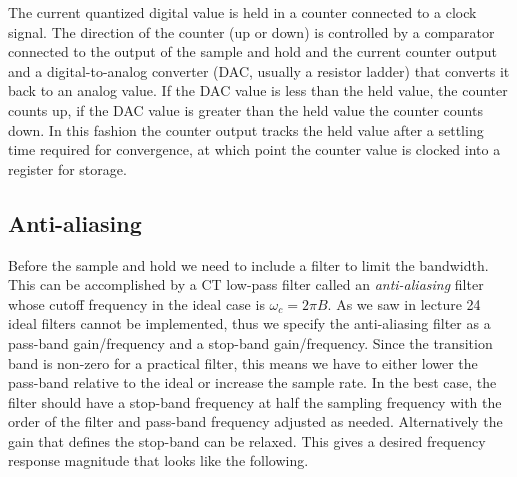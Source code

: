 The current quantized digital value is held in a counter connected to a clock signal. The direction of the counter (up or down) is controlled by a comparator connected to the output of the sample and hold and the current counter output and a digital-to-analog converter (DAC, usually a resistor ladder) that converts it back to an analog value. If the DAC value is less than the held value, the counter counts up, if the DAC value is greater than the held value the counter counts down. In this fashion the counter output tracks the held value after a settling time required for convergence, at which point the counter value is clocked into a register for storage.

\subsection{Anti-aliasing}

Before the sample and hold we need to include a filter to limit the bandwidth. This can be accomplished by a CT low-pass filter called an \emph{anti-aliasing} filter whose cutoff frequency in the ideal case is $\omega_c = 2\pi B$. As we saw in lecture 24 ideal filters cannot be implemented, thus we specify the anti-aliasing filter as a pass-band gain/frequency and a stop-band gain/frequency. Since the transition band is non-zero for a practical filter, this means we have to either lower the pass-band relative to the ideal or increase the sample rate. In the best case, the filter should have a stop-band frequency at half the sampling frequency with the order of the filter and pass-band frequency adjusted as needed. Alternatively the gain that defines the stop-band can be relaxed. This gives a desired frequency response magnitude that looks like the following.

